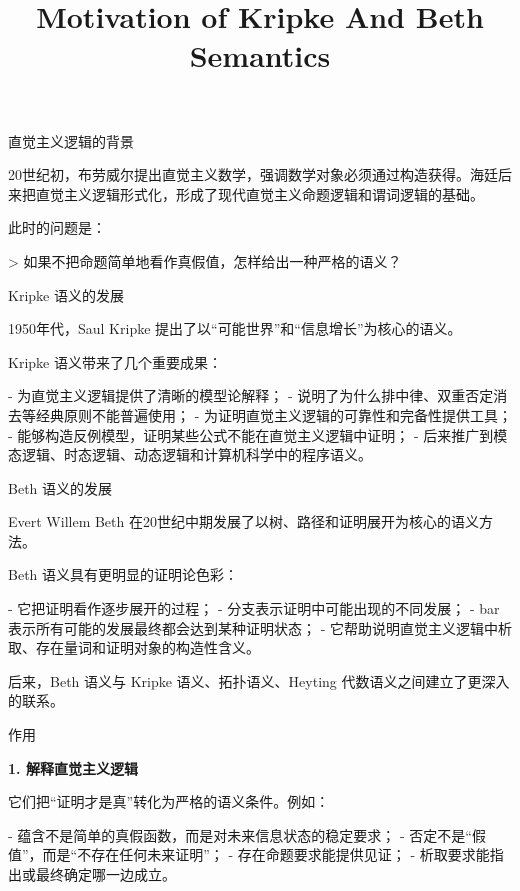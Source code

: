 \documentclass{beamer}
\title{Motivation of Kripke And Beth Semantics}
\date{}
\begin{document}
\begin{frame}
    \titlepage
\end{frame}

\begin{frame}[fragile]{直觉主义逻辑的背景}
\begin{markdown}
20世纪初，布劳威尔提出直觉主义数学，强调数学对象必须通过构造获得。海廷后来把直觉主义逻辑形式化，形成了现代直觉主义命题逻辑和谓词逻辑的基础。

此时的问题是：

> 如果不把命题简单地看作真假值，怎样给出一种严格的语义？
\end{markdown}
\end{frame}

\begin{frame}[fragile]{Kripke 语义的发展}
\begin{markdown}
1950年代，Saul Kripke 提出了以“可能世界”和“信息增长”为核心的语义。

Kripke 语义带来了几个重要成果：

- 为直觉主义逻辑提供了清晰的模型论解释；
- 说明了为什么排中律、双重否定消去等经典原则不能普遍使用；
- 为证明直觉主义逻辑的可靠性和完备性提供工具；
- 能够构造反例模型，证明某些公式不能在直觉主义逻辑中证明；
- 后来推广到模态逻辑、时态逻辑、动态逻辑和计算机科学中的程序语义。
\end{markdown}
\end{frame}

\begin{frame}[fragile]{Beth 语义的发展}
\begin{markdown}
Evert Willem Beth 在20世纪中期发展了以树、路径和证明展开为核心的语义方法。

Beth 语义具有更明显的证明论色彩：

- 它把证明看作逐步展开的过程；
- 分支表示证明中可能出现的不同发展；
- bar 表示所有可能的发展最终都会达到某种证明状态；
- 它帮助说明直觉主义逻辑中析取、存在量词和证明对象的构造性含义。

后来，Beth 语义与 Kripke 语义、拓扑语义、Heyting 代数语义之间建立了更深入的联系。
\end{markdown}
\end{frame}

\begin{frame}[fragile]{作用}
\begin{markdown}
\textbf{1. 解释直觉主义逻辑}

它们把“证明才是真”转化为严格的语义条件。例如：

- 蕴含不是简单的真假函数，而是对未来信息状态的稳定要求；
- 否定不是“假值”，而是“不存在任何未来证明”；
- 存在命题要求能提供见证；
- 析取要求能指出或最终确定哪一边成立。
\end{markdown}
\end{frame}
\end{document}
